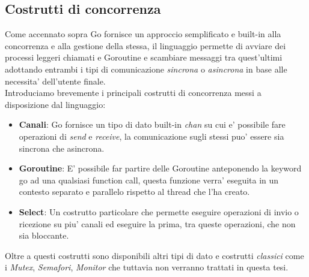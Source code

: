 \subsection{Costrutti di concorrenza}
Come accennato sopra Go fornisce un approccio semplificato e built-in alla concorrenza e alla gestione della stessa, il linguaggio permette di avviare dei processi leggeri chiamati e Goroutine e scambiare messaggi tra quest'ultimi adottando entrambi i tipi di comunicazione \emph{sincrona} o \emph{asincrona} in base alle necessita' dell'utente finale.\\
Introduciamo brevemente i principali costrutti di concorrenza messi a disposizione dal linguaggio:
\begin{itemize}
    \item \textbf{Canali}: Go fornisce un tipo di dato built-in \emph{chan} su cui e' possibile fare operazioni di \emph{send} e \emph{receive}, la comunicazione sugli stessi puo' essere sia sincrona che asincrona.
    \item \textbf{Goroutine}: E' possibile far partire delle Goroutine anteponendo la keyword go ad una qualsiasi function call, questa funzione verra' eseguita in un contesto separato e parallelo rispetto al thread che l'ha creato.
    \item \textbf{Select}: Un costrutto particolare che permette eseguire operazioni di invio o ricezione su piu' canali ed eseguire la prima, tra queste operazioni, che non sia bloccante.
\end{itemize}
Oltre a questi costrutti sono disponibili altri tipi di dato e costrutti \emph{classici} come i \emph{Mutex}, \emph{Semafori}, \emph{Monitor} che tuttavia non verranno trattati in questa tesi.


